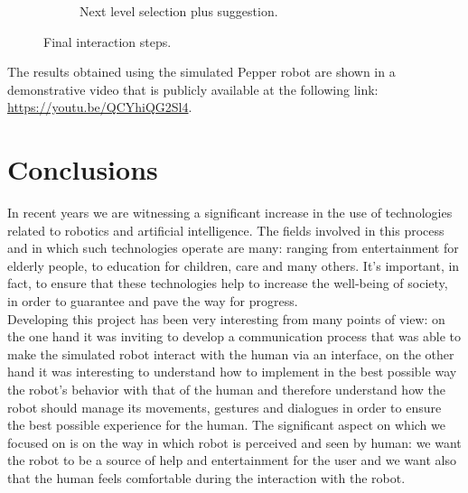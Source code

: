 \documentclass{article}
\begin{document}
\begin{figure}[H]
\begin{subfigure}{.33\textwidth}
      \caption{Next level selection plus suggestion.}
    \end{subfigure}
    \caption{Final interaction steps.}
    \label{fig:fourth}
\end{figure}

\noindent The results obtained using the simulated Pepper robot are shown in a demonstrative video that is publicly available at the following link: \url{https://youtu.be/QCYhiQG2Sl4}.

\section{Conclusions}
\indent In recent years we are witnessing a significant increase in the use of technologies related to robotics and artificial intelligence. The fields involved in this process and in which such technologies operate are many: ranging from entertainment for elderly people, to education for children, care and many others. It's important, in fact, to ensure that these technologies help to increase the well-being of society, in order to guarantee and pave the way for progress. \\
\noindent Developing this project has been very interesting from many points of view: on the one hand it was inviting to develop a communication process that was able to make the simulated robot interact with the human via an interface, on the other hand it was interesting to understand how to implement in the best possible way the robot's behavior with that of the human and therefore understand how the robot should manage its movements, gestures and dialogues in order to ensure the best possible experience for the human. The significant aspect on which we focused on is on the way in which robot is perceived and seen by human: we want the robot to be a source of help and entertainment for the user and we want also that the human feels comfortable during the interaction with the robot.
\end{document}
